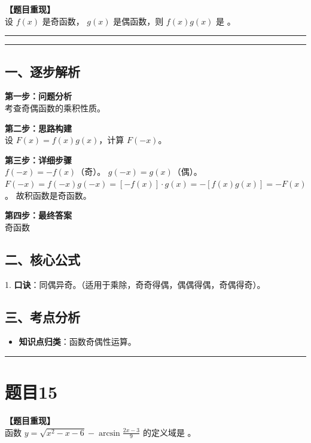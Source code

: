 \documentclass[12pt, a4paper]{ctexart}
\newcommand{\TopSeparator}{
    \par\noindent\rule{\textwidth}{1.5pt}\vspace{0.5em} %
}
\newcommand{\AnalysisSeparator}{
    \par\noindent\rule{\textwidth}{0.5pt}\vspace{0.2em}\hrule\vspace{0.5em} %
}
\newenvironment{RedAnalysis}{
    \par
    \color{red} %
}{
    \par
    \color{black} %
}
\begin{document}
\textbf{【题目重现】} \\
设 $ f(x) $ 是奇函数， $ g(x) $ 是偶函数，则 $ f(x)g(x) $ 是 \underline{\hspace{2cm}}。

\AnalysisSeparator

\begin{RedAnalysis}

\subsection*{一、逐步解析}

\textbf{第一步：问题分析} \\
考查奇偶函数的乘积性质。

\textbf{第二步：思路构建} \\
设 $F(x) = f(x)g(x)$，计算 $F(-x)$。

\textbf{第三步：详细步骤} \\
$f(-x) = -f(x)$（奇）。
$g(-x) = g(x)$（偶）。
$F(-x) = f(-x)g(-x) = [-f(x)] \cdot g(x) = -[f(x)g(x)] = -F(x)$。
故积函数是奇函数。

\textbf{第四步：最终答案} \\
奇函数

\subsection*{二、核心公式}
1. \textbf{口诀}：同偶异奇。（适用于乘除，奇奇得偶，偶偶得偶，奇偶得奇）。

\subsection*{三、考点分析}
\begin{itemize}
    \item \textbf{知识点归类}：函数奇偶性运算。
\end{itemize}

\end{RedAnalysis}

\vspace{2em}

\TopSeparator
\section*{题目15}

\textbf{【题目重现】} \\
函数 $ y=\sqrt{x^{2}-x-6}-\arcsin\frac{2x-3}{9} $ 的定义域是 \underline{\hspace{2cm}}。
\end{document}
